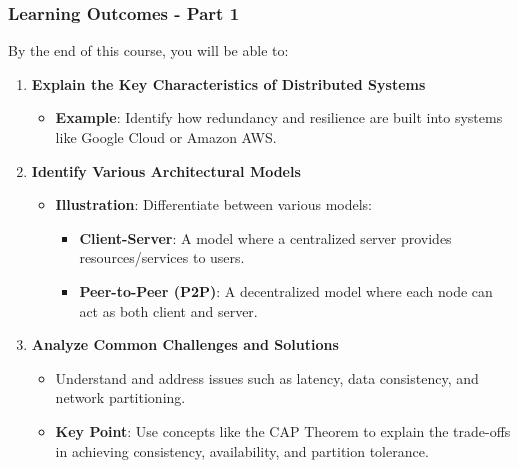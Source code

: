\documentclass[aspectratio=169]{beamer}
\begin{document}
\begin{frame}[fragile]
    \frametitle{Learning Outcomes - Part 1}
    By the end of this course, you will be able to:
    \begin{enumerate}
        \item \textbf{Explain the Key Characteristics of Distributed Systems}
            \begin{itemize}
                \item \textbf{Example}: Identify how redundancy and resilience are built into systems like Google Cloud or Amazon AWS.
            \end{itemize}
        
        \item \textbf{Identify Various Architectural Models}
            \begin{itemize}
                \item \textbf{Illustration}: Differentiate between various models:
                \begin{itemize}
                    \item \textbf{Client-Server}: A model where a centralized server provides resources/services to users.
                    \item \textbf{Peer-to-Peer (P2P)}: A decentralized model where each node can act as both client and server.
                \end{itemize}
            \end{itemize}
            
        \item \textbf{Analyze Common Challenges and Solutions}
            \begin{itemize}
                \item Understand and address issues such as latency, data consistency, and network partitioning.
                \item \textbf{Key Point}: Use concepts like the CAP Theorem to explain the trade-offs in achieving consistency, availability, and partition tolerance.
            \end{itemize}
    \end{enumerate}
\end{frame}
\end{document}
